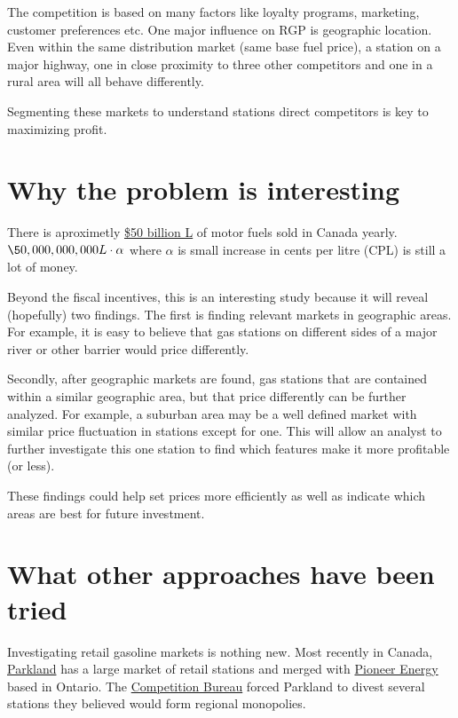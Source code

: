 \documentclass[11pt]{article}
\begin{document}
The competition is based on many factors like loyalty programs, marketing,
customer preferences etc. One major influence on RGP is geographic
location. Even within the same distribution market (same base fuel price), a
station on a major highway, one in close proximity to three other competitors
and one in a rural area will all behave differently.

Segmenting these markets to understand stations direct competitors is key to
maximizing profit.

\section{Why the problem is interesting}
\label{sec:orga9f4d0a}

There is aproximetly \href{https://www150.statcan.gc.ca/t1/tbl1/en/tv.action?pid=2310006601}{\$50 billion L} of motor fuels sold in Canada yearly.
\(\50,000,000,000L \cdot \alpha\) where \(\alpha\) is small increase in cents per
litre (CPL) is still a lot of money. 

Beyond the fiscal incentives, this is an interesting study because it will
reveal (hopefully) two findings. The first is finding relevant markets in
geographic areas. For example, it is easy to believe that gas stations on
different sides of a major river or other barrier would price differently.

Secondly, after geographic markets are found, gas stations that are contained
within a similar geographic area, but that price differently can be further
analyzed. For example, a suburban area may be a well defined market with similar
price fluctuation in stations except for one. This will allow an analyst to
further investigate this one station to find which features make it more
profitable (or less).

These findings could help set prices more efficiently as well as indicate which
areas are best for future investment. 


\section{What other approaches have been tried}
\label{sec:org403c263}

Investigating retail gasoline markets is nothing new. Most recently in Canada,
\href{https://www.parkland.ca/en/our-businesses/retail/}{Parkland} has a large market of retail stations and merged with \href{https://en.wikipedia.org/wiki/Pioneer\_Energy}{Pioneer Energy}
based in Ontario.  The \href{http://www.competitionbureau.gc.ca/eic/site/cb-bc.nsf/eng/04053.html}{Competition Bureau} forced Parkland to divest several
stations they believed would form regional monopolies.
\end{document}
